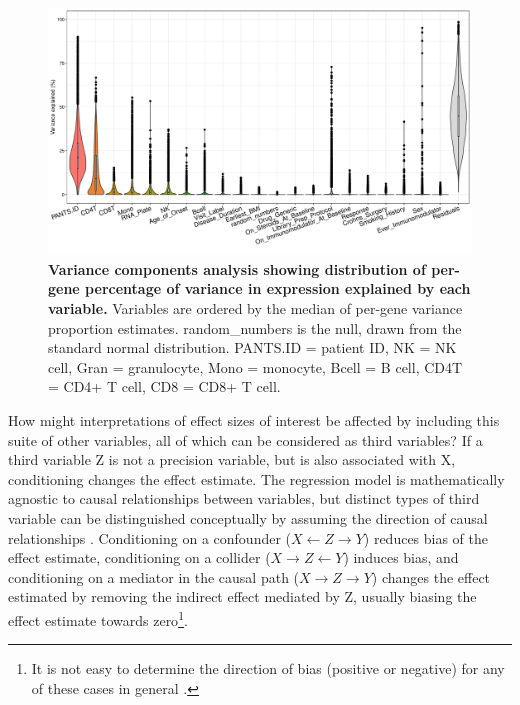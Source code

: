 \begin{figure}
    \centering
    \includegraphics[width=1.0\textwidth,page=1]{mainmatter/figures/chapter_04/dream.plotVarPart.pdf}
    \caption{
        \textbf{Variance components analysis showing distribution of per-gene percentage of variance in expression explained by each variable.}
        Variables are ordered by the median of per-gene variance proportion estimates.
        random\_numbers is the null, drawn from the standard normal distribution.
        PANTS.ID = patient ID, NK = \gls{NK} cell, Gran = granulocyte, Mono = monocyte, Bcell = B cell, CD4T = CD4+ T cell, CD8 = CD8+ T cell.
}
    \label{fig:multipants_varPart}
\end{figure}

How might interpretations of effect sizes of interest be affected by including this suite of other variables, all of which can be considered as third variables?
If a third variable Z is not a precision variable, but is also associated with X, conditioning changes the effect estimate.
The regression model is mathematically agnostic to causal relationships between variables,
but distinct types of third variable can be distinguished conceptually by assuming the direction of causal relationships \autocite{mackinnon2000EquivalenceMediationConfounding}.
Conditioning on a confounder ($X \leftarrow Z \rightarrow Y$) reduces bias of the effect estimate,
conditioning on a collider ($X \rightarrow Z \leftarrow Y$) induces bias,
and conditioning on a mediator in the causal path ($X \rightarrow Z \rightarrow Y$) changes the effect estimated by removing the indirect effect mediated by Z,
usually biasing the effect estimate towards zero\footnote{It is not easy to determine the direction of bias (positive or negative) for any of these cases in general \autocite{suzuki2020CausalDiagramsPitfalls}.}.

